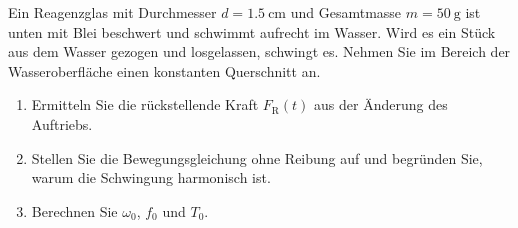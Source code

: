 \begin{ExerciseBlock}
Ein Reagenzglas mit Durchmesser $d=\qty{1.5}{\centi\metre}$ und Gesamtmasse $m=\qty{50}{\gram}$ ist unten mit Blei beschwert und schwimmt aufrecht im Wasser. Wird es ein Stück aus dem Wasser gezogen und losgelassen, schwingt es. Nehmen Sie im Bereich der Wasseroberfläche einen konstanten Querschnitt an.
\begin{center}
\end{center}
\begin{enumerate}
\item Ermitteln Sie die rückstellende Kraft $F_\mathrm R(t)$ aus der Änderung des Auftriebs.
\item Stellen Sie die Bewegungsgleichung ohne Reibung auf und begründen Sie, warum die Schwingung harmonisch ist.
\item Berechnen Sie $\omega_0$, $f_0$ und $T_0$.
\end{enumerate}
\end{ExerciseBlock}
